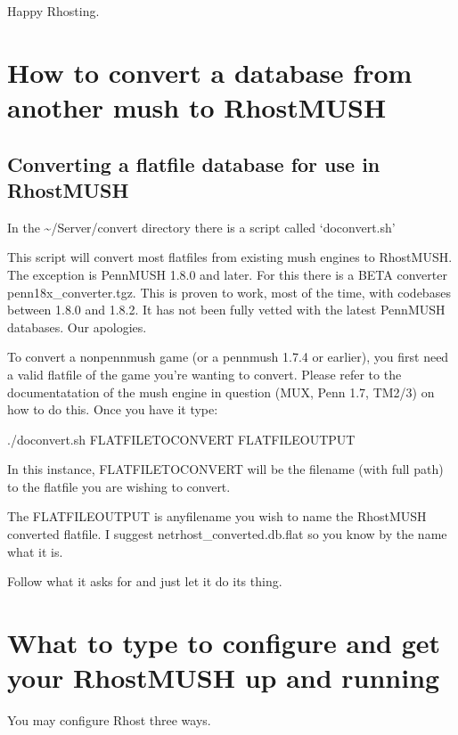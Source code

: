 \documentclass[letterpaper,10pt,english]{sphinxmanual}
\begin{document}
\sphinxAtStartPar
Happy Rhosting.


\chapter{How to convert a database from another mush to RhostMUSH}
\label{\detokenize{03-dbconversion:how-to-convert-a-database-from-another-mush-to-rhostmush}}\label{\detokenize{03-dbconversion::doc}}

\section{Converting a flatfile database for use in RhostMUSH}
\label{\detokenize{03-dbconversion:converting-a-flatfile-database-for-use-in-rhostmush}}
\sphinxAtStartPar
In the \textasciitilde{}/Server/convert directory there is a script called ‘doconvert.sh’

\sphinxAtStartPar
This script will convert most flatfiles from existing mush engines to
RhostMUSH.  The exception is PennMUSH 1.8.0 and later.  For this there is a
BETA converter penn18x\_converter.tgz.  This is proven to work, most of the time,
with codebases between 1.8.0 and 1.8.2.  It has not been fully vetted with
the latest PennMUSH databases.  Our apologies.

\sphinxAtStartPar
To convert a non\sphinxhyphen{}pennmush game (or a pennmush 1.7.4 or earlier), you first
need a valid flatfile of the game you’re wanting to convert.  Please refer
to the documentatation of the mush engine in question (MUX, Penn 1.7, TM2/3)
on how to do this.  Once you have it type:

\sphinxAtStartPar
./doconvert.sh FLATFILETOCONVERT FLATFILEOUTPUT

\sphinxAtStartPar
In this instance, FLATFILETOCONVERT will be the filename (with full path) to
the flatfile you are wishing to convert.

\sphinxAtStartPar
The FLATFILEOUTPUT is anyfilename you wish to name the RhostMUSH converted
flatfile.  I suggest netrhost\_converted.db.flat so you know by the name
what it is.

\sphinxAtStartPar
Follow what it asks for and just let it do its thing.


\chapter{What to type to configure and get your RhostMUSH up and running}
\label{\detokenize{04-configure:what-to-type-to-configure-and-get-your-rhostmush-up-and-running}}\label{\detokenize{04-configure::doc}}
\sphinxAtStartPar
You may configure Rhost three ways.
\end{document}
